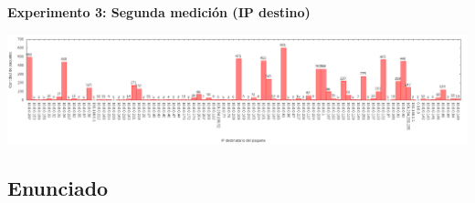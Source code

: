 \newpage

\textbf{Experimento 3: Segunda medición (IP destino)} \label{exp3_2_dst}
\begin{center}
  \includegraphics[angle=90, height=0.8\textheight]{../mediciones/job2/dst.png}
\end{center}

\subsection{Enunciado}


